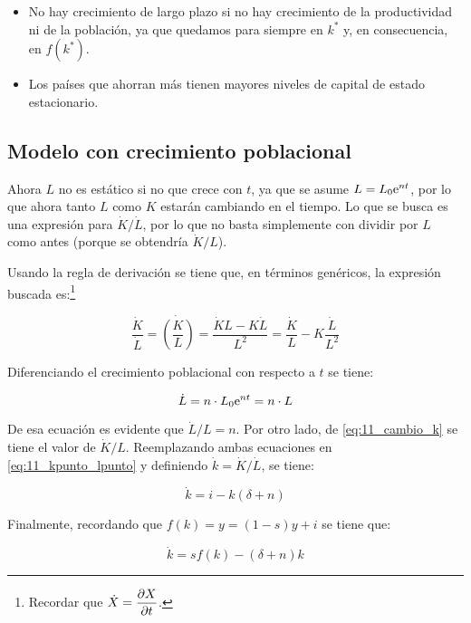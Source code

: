 \documentclass[DeGregorioResumen]{subfiles}
\begin{document}
\begin{itemize}
\item No hay crecimiento de largo plazo si no hay crecimiento de la productividad ni de la población, ya que quedamos para siempre en $k^*$ y, en consecuencia, en $f(k^*)$.
\item Los países que ahorran más tienen mayores niveles de capital de estado estacionario. 
\end{itemize}

\subsection{Modelo con crecimiento poblacional}
Ahora $L$ no es estático si no que crece con $t$, ya que se asume $L=L_0\mathrm{e}^{nt}$, por lo que ahora tanto $L$ como $K$ estarán cambiando en el tiempo. Lo que se busca es una expresión para $\dot{K}/\dot{L}$, por lo que no basta simplemente con dividir por $L$ como antes (porque se obtendría $\dot{K}/L$).

Usando la regla de derivación se tiene que, en términos genéricos, la expresión buscada es:\footnote{Recordar que $\displaystyle \dot{X}=\frac{\partial X}{\partial t}$.}

\begin{equation}
\frac{\dot{K}}{\dot{L}} = \dot{\left(\frac{K}{L}\right)} = \frac{\dot{K}L-K\dot{L}}{L^2} = \frac{\dot{K}}{L} - K\frac{\dot{L}}{L^2}
\label{eq:11_kpunto_lpunto}
\end{equation}

Diferenciando el crecimiento poblacional con respecto a $t$ se tiene:

\begin{equation*}
\dot{L} = n\cdot L_0 \mathrm{e}^{nt} = n\cdot L
\end{equation*}

De esa ecuación es evidente que $\dot L / L=n$. Por otro lado, de \eqref{eq:11_cambio_k} se tiene el valor de $\dot K / L$. Reemplazando ambas ecuaciones en \eqref{eq:11_kpunto_lpunto} y definiendo $\dot k = \dot{K}/\dot L$, se tiene:

\begin{equation*}
\dot k = i-k(\delta + n)
\end{equation*}

Finalmente, recordando que $f(k)=y=(1-s)y+i$ se tiene que:

\begin{equation}
\dot k = sf(k) - (\delta + n)k
\label{eq:11-k_pto_con_crecimiento}
\end{equation}
\end{document}
